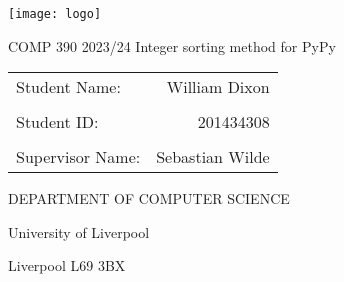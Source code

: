 \documentclass[12pt]{article}
\begin{document}
    \begin{center}
      
    
    \texttt{[image: logo]}
    \vspace{2cm}
    \begin{LARGE}
      \linebreak
      COMP 390
      \vspace{.8cm}
      \linebreak
      \vspace{1.5cm}
      2023/24
      \linebreak     
      Integer sorting method for PyPy   
    \end{LARGE}
    \linebreak   
    \vspace{2.5cm}
    \begin{table}[h]
      \begin{large}
        
        \centering
        \begin{tabularx}{.7\linewidth}{Xr}
          
          Student Name: & William Dixon \\
          & \\
          Student ID: & 201434308\\
          & \\
          Supervisor Name: & Sebastian Wilde
        \end{tabularx}
        
      \end{large}
      \end{table}
      \vspace{1cm}
      
    \begin{LARGE}
      
      DEPARTMENT OF\linebreak      
      COMPUTER SCIENCE
      \vspace{4.5cm}
      
    \end{LARGE}
    \begin{large}
      
      University of Liverpool
      
      Liverpool L69 3BX
    \end{large}
      
  \end{center}
  \pagebreak
\end{document}

